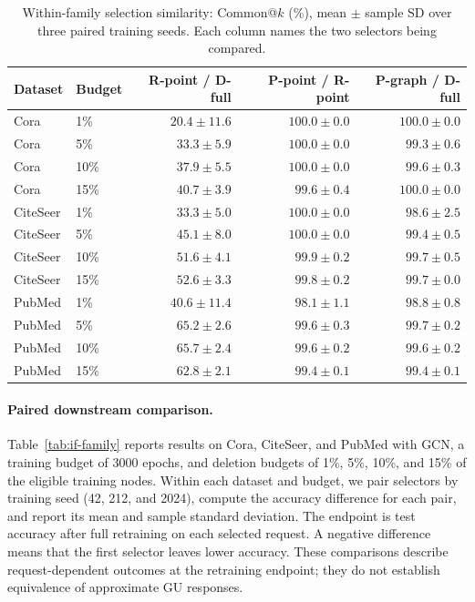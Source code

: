 \begin{table}[t]
\centering
\small
\setlength{\tabcolsep}{4pt}
\caption{Within-family selection similarity: Common@$k$ (\%), mean $\pm$ sample SD over three paired training seeds. Each column names the two selectors being compared.}
\label{tab:if-similarity}
\begin{tabular}{llrrr}
\toprule
Dataset & Budget & R-point / D-full & P-point / R-point & P-graph / D-full \\
\midrule
Cora & 1\% & $20.4\pm11.6$ & $100.0\pm0.0$ & $100.0\pm0.0$ \\
Cora & 5\% & $33.3\pm5.9$ & $100.0\pm0.0$ & $99.3\pm0.6$ \\
Cora & 10\% & $37.9\pm5.5$ & $100.0\pm0.0$ & $99.6\pm0.3$ \\
Cora & 15\% & $40.7\pm3.9$ & $99.6\pm0.4$ & $100.0\pm0.0$ \\
CiteSeer & 1\% & $33.3\pm5.0$ & $100.0\pm0.0$ & $98.6\pm2.5$ \\
CiteSeer & 5\% & $45.1\pm8.0$ & $100.0\pm0.0$ & $99.4\pm0.5$ \\
CiteSeer & 10\% & $51.6\pm4.1$ & $99.9\pm0.2$ & $99.7\pm0.5$ \\
CiteSeer & 15\% & $52.6\pm3.3$ & $99.8\pm0.2$ & $99.7\pm0.0$ \\
PubMed & 1\% & $40.6\pm11.4$ & $98.1\pm1.1$ & $98.8\pm0.8$ \\
PubMed & 5\% & $65.2\pm2.6$ & $99.6\pm0.3$ & $99.7\pm0.2$ \\
PubMed & 10\% & $65.7\pm2.4$ & $99.6\pm0.2$ & $99.6\pm0.2$ \\
PubMed & 15\% & $62.8\pm2.1$ & $99.4\pm0.1$ & $99.4\pm0.1$ \\
\bottomrule
\end{tabular}
\end{table}

\paragraph{Paired downstream comparison.}
Table~\ref{tab:if-family} reports results on Cora, CiteSeer, and PubMed with GCN, a training budget of 3000 epochs, and deletion budgets of 1\%, 5\%, 10\%, and 15\% of the eligible training nodes. Within each dataset and budget, we pair selectors by training seed (42, 212, and 2024), compute the accuracy difference for each pair, and report its mean and sample standard deviation. The endpoint is test accuracy after full retraining on each selected request. A negative difference means that the first selector leaves lower accuracy. These comparisons describe request-dependent outcomes at the retraining endpoint; they do not establish equivalence of approximate GU responses.

